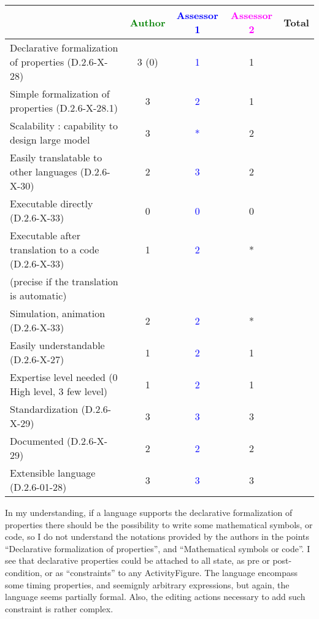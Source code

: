 \begin{tabular}{|l | c | c | c | c|}
\hline
& \textcolor{green}{Author} & \textcolor{blue}{Assessor 1} & \textcolor{magenta}{Assessor 2} & Total \\
\hline
Declarative formalization of properties (D.2.6-X-28) & 3 (0) & \textcolor{blue}{1} & 1 & \\
\hline
Simple formalization of properties (D.2.6-X-28.1) & 3 &  \textcolor{blue}{2} & 1 & \\
\hline
Scalability : capability to design large model & 3 & \textcolor{blue}{*} & 2 & \\
\hline
Easily translatable to other languages (D.2.6-X-30) & 2 & \textcolor{blue}{3} & 2 & \\
\hline
Executable directly (D.2.6-X-33) & 0 & \textcolor{blue}{0} & 0 & \\
\hline
Executable after translation to a code (D.2.6-X-33) & 1 & \textcolor{blue}{2} & * & \\
(precise if the translation is automatic) & & & & \\
\hline
Simulation, animation (D.2.6-X-33) & 2 & \textcolor{blue}{2} & * & \\
\hline
Easily understandable (D.2.6-X-27) & 1 & \textcolor{blue}{2} &  1 & \\
\hline
Expertise level needed (0 High level, 3 few level) & 1 & \textcolor{blue}{2} &  1 & \\
\hline
Standardization (D.2.6-X-29) & 3 & \textcolor{blue}{3} & 3 & \\
\hline
Documented (D.2.6-X-29) & 2 & \textcolor{blue}{2} & 2 & \\
\hline
Extensible language (D.2.6-01-28) & 3 & \textcolor{blue}{3} & 3 & \\
\hline
\end{tabular}

\begin{assessor1}
In my understanding, if a language supports the declarative formalization of properties there should be the possibility to write some mathematical symbols, or code, so I do not understand the notations provided by the authors in the points
"`Declarative formalization of properties"', and "`Mathematical symbols or code"'. I see that declarative properties could be attached to all state, as pre or post-condition, or as "`constraints"' to any ActivityFigure. The language encompass some timing properties, and seemignly arbitrary expressions, but again, the language seems partially formal. Also, the editing actions necessary to add such constraint is rather complex. 
\end{assessor1}

